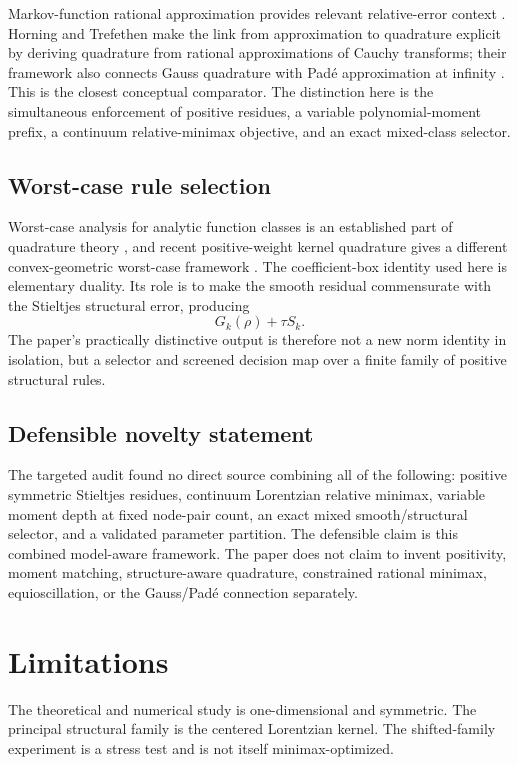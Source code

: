\documentclass[preprint,12pt]{elsarticle}
\theoremstyle{remark}
\begin{document}
Markov-function rational approximation provides relevant relative-error
context \cite{beckermann2021}. Horning and Trefethen make the link from
approximation to quadrature explicit by deriving quadrature
from rational approximations of Cauchy transforms; their framework also
connects Gauss quadrature with Pad\'e approximation at infinity
\cite{horning2025}. This is the closest conceptual comparator. The
distinction here is the simultaneous enforcement of positive residues,
a variable polynomial-moment prefix, a continuum relative-minimax
objective, and an exact mixed-class selector.

\subsection{Worst-case rule selection}

Worst-case analysis for analytic function classes is an established
part of quadrature theory \cite{trefethen2022,goda2024}, and recent
positive-weight kernel quadrature gives a different
convex-geometric worst-case framework \cite{hayakawa2026}. The
coefficient-box identity used here is elementary duality. Its role is
to make the smooth residual commensurate with the Stieltjes structural
error, producing
\[
G_k(\rho)+\tau S_k.
\]
The paper's practically distinctive output is therefore not a new norm
identity in isolation, but a selector and screened decision map over a
finite family of positive structural rules.

\subsection{Defensible novelty statement}

The targeted audit found no direct source combining all of the
following: positive symmetric Stieltjes residues, continuum Lorentzian
relative minimax, variable moment depth at fixed node-pair count, an
exact mixed smooth/structural selector, and a validated parameter
partition. The defensible claim is this combined model-aware framework.
The paper does not claim to invent positivity, moment matching,
structure-aware quadrature, constrained rational minimax,
equioscillation, or the Gauss/Pad\'e connection separately.

\section{Limitations}

The theoretical and numerical study is one-dimensional and symmetric.
The principal structural family is the centered Lorentzian kernel. The
shifted-family experiment is a stress test and is not itself
minimax-optimized.
\end{document}
